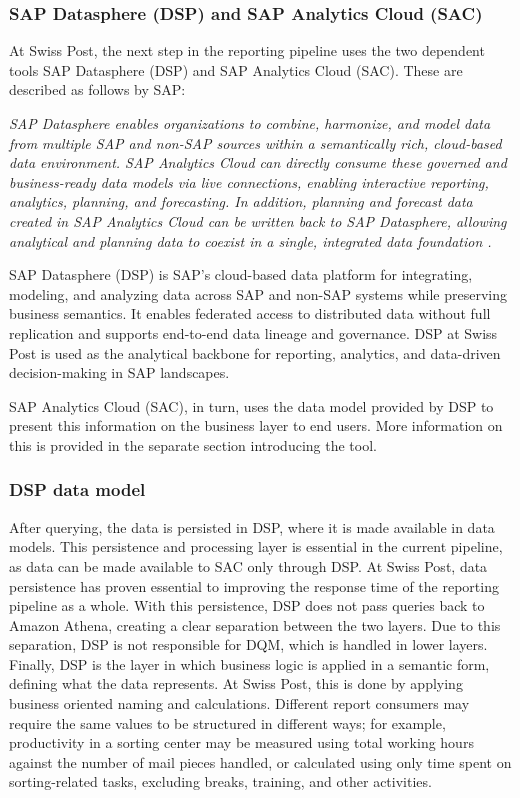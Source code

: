 \subsubsection*{SAP Datasphere (DSP) and SAP Analytics Cloud (SAC)}
At Swiss Post, the next step in the reporting pipeline uses the two dependent tools SAP Datasphere (DSP) and SAP Analytics Cloud (SAC). These are described as follows by SAP:

\textit{SAP Datasphere enables organizations to combine, harmonize, and model data from multiple SAP and non-SAP sources within a semantically rich, cloud-based data environment. 
SAP Analytics Cloud can directly consume these governed and business-ready data models via live connections, enabling interactive reporting, analytics, planning, and forecasting. 
In addition, planning and forecast data created in SAP Analytics Cloud can be written back to SAP Datasphere, allowing analytical and planning data to coexist in a single, integrated data foundation \cite{sap_datasphere_sac_integration}.}

SAP Datasphere (DSP) is SAP’s cloud-based data platform for integrating, modeling, and analyzing data across SAP and non-SAP systems while preserving business semantics. It enables federated access to distributed data without full replication and supports end-to-end data lineage and governance. DSP at Swiss Post is used as the analytical backbone for reporting, analytics, and data-driven decision-making in SAP landscapes.

SAP Analytics Cloud (SAC), in turn, uses the data model provided by DSP to present this information on the business layer to end users. More information on this is provided in the separate section introducing the tool.


\subsubsection*{DSP data model}
\label{SolutionDesignDSPModel}
After querying, the data is persisted in \gls{DSP}, where it is made available in data models. This persistence and processing layer is essential in the current pipeline, as data can be made available to \gls{SAC} only through DSP. At Swiss Post, data persistence has proven essential to improving the response time of the reporting pipeline as a whole.
 With this persistence, DSP does not pass queries back to Amazon Athena, creating a clear separation between the two layers. Due to this separation, DSP is not responsible for DQM, which is handled in lower layers. Finally, DSP is the layer in which business logic is applied in a semantic form, defining what the data represents. At Swiss Post, this is done by applying business oriented naming and calculations. Different report consumers may require the same values to be structured in different ways; for example, productivity in a sorting center may be measured using total working hours against the number of mail pieces handled, or calculated using only time spent on sorting-related tasks, excluding breaks, training, and other activities.
 
